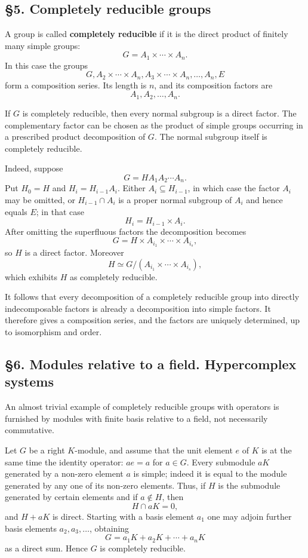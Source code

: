 \documentclass[11pt]{article}
\begin{document}
\subsection{§5. Completely reducible
groups}\label{completely-reducible-groups}

A group is called \textbf{completely reducible} if it is the direct
product of finitely many simple groups: \[
  G=A_1\times\cdots\times A_n.
\] In this case the groups \[
  G,
  A_2\times\cdots\times A_n,
  A_3\times\cdots\times A_n,
  \ldots,
  A_n,
  E
\] form a composition series. Its length is \(n\), and its composition
factors are \[
  A_1,A_2,\ldots,A_n.
\]

If \(G\) is completely reducible, then every normal subgroup is a direct
factor. The complementary factor can be chosen as the product of simple
groups occurring in a prescribed product decomposition of \(G\). The
normal subgroup itself is completely reducible.

Indeed, suppose \[
  G=H A_1A_2\cdots A_n.
\] Put \(H_0=H\) and \(H_i=H_{i-1}A_i\). Either
\(A_i\subseteq H_{i-1}\), in which case the factor \(A_i\) may be
omitted, or \(H_{i-1}\cap A_i\) is a proper normal subgroup of \(A_i\)
and hence equals \(E\); in that case \[
  H_i=H_{i-1}\times A_i.
\] After omitting the superfluous factors the decomposition becomes \[
  G=H\times A_{i_1}\times\cdots\times A_{i_s},
\] so \(H\) is a direct factor. Moreover \[
  H\simeq G/(A_{i_1}\times\cdots\times A_{i_s}),
\] which exhibits \(H\) as completely reducible.

It follows that every decomposition of a completely reducible group into
directly indecomposable factors is already a decomposition into simple
factors. It therefore gives a composition series, and the factors are
uniquely determined, up to isomorphism and order.

\subsection{§6. Modules relative to a field. Hypercomplex
systems}\label{modules-relative-to-a-field.-hypercomplex-systems}

An almost trivial example of completely reducible groups with operators
is furnished by modules with finite basis relative to a field, not
necessarily commutative.

Let \(G\) be a right \(K\)-module, and assume that the unit element
\(e\) of \(K\) is at the same time the identity operator: \(ae=a\) for
\(a\in G\). Every submodule \(aK\) generated by a non-zero element \(a\)
is simple; indeed it is equal to the module generated by any one of its
non-zero elements. Thus, if \(H\) is the submodule generated by certain
elements and if \(a\notin H\), then \[
  H\cap aK=0,
\] and \(H+aK\) is direct. Starting with a basis element \(a_1\) one may
adjoin further basis elements \(a_2,a_3,\ldots\), obtaining \[
  G=a_1K+a_2K+\cdots+a_nK
\] as a direct sum. Hence \(G\) is completely reducible.
\end{document}
